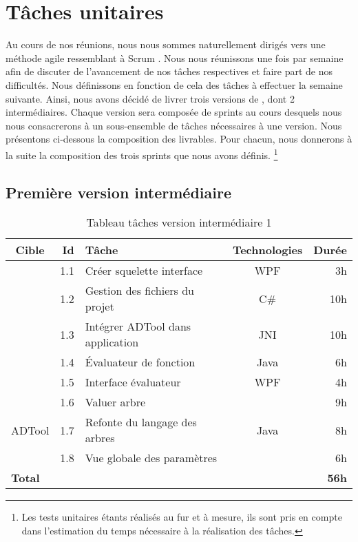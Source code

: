 \section{Tâches unitaires}
	\label{sec:taches_unitaires}

	Au cours de nos réunions, nous nous sommes naturellement dirigés vers une méthode agile ressemblant à \og Scrum \fg. Nous nous réunissons une fois par semaine afin de discuter de l'avancement de nos tâches respectives et faire part de nos difficultés. Nous définissons en fonction de cela des tâches à effectuer la semaine suivante. Ainsi, nous avons décidé de livrer trois versions de \glasir{}, dont 2 intermédiaires.
	Chaque version sera composée de sprints au cours desquels nous nous consacrerons à un sous-ensemble de tâches nécessaires à une version. %
	Nous présentons ci-dessous la composition des livrables. Pour chacun, nous donnerons à la suite la composition des trois sprints que nous avons définis.
	\footnote{Les tests unitaires étants réalisés au fur et à mesure, ils sont pris en compte dans l'estimation du temps nécessaire à la réalisation des tâches.}

	\newpage\subsection{Première version intermédiaire}

		\begin{table}[h]
			\centering
			\begin{tabular}{|c|r|l|c|r|}
				\hline
				\textbf{Cible} & \textbf{Id} & \textbf{Tâche} & \textbf{Technologies} & \textbf{Durée}\\
				\hline

				\multirow{5}{*}{\glasir{}} & 1.1 & Créer squelette interface & WPF & 3h\\
				\cline{2-5}
				 & 1.2 & Gestion des fichiers du projet & C\# & 10h\\
				\cline{2-5}
				 & 1.3 & Intégrer ADTool dans application & JNI & 10h\\
				\cline{2-5}
				 & 1.4 & \'Evaluateur de fonction & Java & 6h\\
				\cline{2-5}
				 & 1.5 & Interface évaluateur & WPF & 4h\\
				\hline

				\multirow{3}{*}{ADTool} & 1.6 & Valuer arbre & \multirow{3}{*}{Java} & 9h\\
				\cline{2-3} \cline{5-5}
				 & 1.7 & Refonte du langage des arbres & & 8h\\
				\cline{2-3} \cline{5-5}
				 & 1.8 & Vue globale des paramètres & & 6h\\
				\hline

				\multicolumn{4}{|l|}{\bf Total} & {\bf 56h}\\
				\hline
			\end{tabular}
			\caption{Tableau tâches version intermédiaire 1}
			\label{fig:taches_units_1}
		\end{table}

